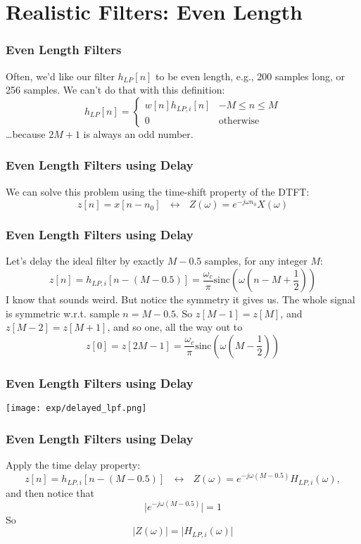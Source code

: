 \documentclass{beamer}
\begin{document}
\section[Even Length]{Realistic Filters: Even Length}
\setcounter{subsection}{1}

\begin{frame}
  \frametitle{Even Length Filters}

  Often, we'd like our filter $h_{LP}[n]$ to be even length, e.g., 200
  samples long, or 256 samples.  We can't do that with this definition:
  \[
  h_{LP}[n] = \begin{cases}
    w[n]h_{LP,i}[n] & -M\le n\le M\\
    0 &\mbox{otherwise}
  \end{cases}
  \]
  \ldots because $2M+1$ is always an odd number.
\end{frame}

\begin{frame}
  \frametitle{Even Length Filters using Delay}

  We can solve this problem using the time-shift property of the DTFT:
  \[
  z[n] = x[n-n_0]~~~\leftrightarrow~~~
  Z(\omega)=e^{-j\omega n_0}X(\omega)
  \]
\end{frame}
  
\begin{frame}
  \frametitle{Even Length Filters using Delay}

  Let's delay the ideal filter by exactly $M-0.5$ samples, for any
  integer $M$:
  \[
  z[n] = h_{LP,i}\left[n-(M-0.5)\right] =
  \frac{\omega_c}{\pi}\mbox{sinc}\left(\omega \left(n-M+\frac{1}{2}\right)\right)
  \]
  I know that sounds weird.  But notice the symmetry it gives us.  The whole signal is symmetric
  w.r.t. sample $n=M-0.5$.  So $z[M-1]=z[M]$, and $z[M-2]=z[M+1]$, and so one, all the way out to
  \begin{displaymath}
    z[0] = z[2M-1] =
    \frac{\omega_c}{\pi}\mbox{sinc}\left(\omega \left(M-\frac{1}{2}\right)\right)
  \end{displaymath}
\end{frame}

\begin{frame}
  \frametitle{Even Length Filters using Delay}
  
  \centerline{\texttt{[image: exp/delayed\_lpf.png]}}
\end{frame}
  
\begin{frame}
  \frametitle{Even Length Filters using Delay}

  Apply the time delay property:
  \[
  z[n] = h_{LP,i}\left[n-(M-0.5)\right]
  ~~~\leftrightarrow~~~
  Z(\omega)=e^{-j\omega (M-0.5)}H_{LP,i}(\omega),
  \]
  and then notice that
  \[
  \vert e^{-j\omega (M-0.5)}\vert = 1
  \]
  So
  \[
  \vert Z(\omega)\vert =\vert H_{LP,i}(\omega)\vert
  \]
\end{frame}
\end{document}
